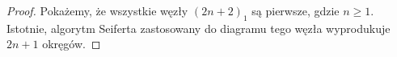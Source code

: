 \begin{proof}
    Pokażemy, że wszystkie węzły $(2n+2)_1$ są pierwsze, gdzie $n \ge 1$.
    Istotnie, algorytm Seiferta zastosowany do diagramu tego węzła wyprodukuje $2n+1$ okręgów.
\begin{comment}
    \[
        \begin{tikzpicture}[baseline=-0.65ex,scale=0.055]
        \begin{knot}[clip width=10, flip crossing/.list={1,4,5},end tolerance=1pt]
            \node at (0,10) {$\cdots$};
            \strand[semithick] (-30, -5) -- (-5, -5);
            \strand[semithick,-Latex]  (5, -5) -- (30, -5);
            \strand[semithick,Latex-]  (-30,-15) -- (-5,-15);
            \strand[semithick,Latex-]  (5,-15) -- (30,-15);

            \strand[semithick,domain=-90:90] plot ({7.5*cos(\x)-5}, {5*sin(\x)-10});
            \strand[semithick,domain=90:270] plot ({7.5*cos(\x)+5}, {5*sin(\x)-10});

            \strand[semithick] (-30, 15) to [out=left, in=up]   (-45, 0);
            \strand[semithick] (-30,-15) to [out=left, in=down] (-45, 0);
            \strand[semithick] (-30,  5) to [out=left, in=up]   (-35, 0);
            \strand[semithick] (-30, -5) to [out=left, in=down] (-35, 0);

            \strand[semithick] (30, 15) to [out=right, in=up]   (45,0);
            \strand[semithick] (30,-15) to [out=right, in=down] (45,0);
            \strand[semithick] (30,  5) to [out=right, in=up]   (35,0);
            \strand[semithick] (30, -5) to [out=right, in=down] (35,0);

            \strand[semithick] (-30, 15) .. controls (-24, 15) and (-24,  5) .. (-20,  5);
            \strand[semithick] (-30,  5) .. controls (-24,  5) and (-24, 15) .. (-20, 15);
            \strand[semithick] (-10, 15) .. controls (-16, 15) and (-16,  5) .. (-20,  5);
            \strand[semithick] (-10,  5) .. controls (-16,  5) and (-16, 15) .. (-20, 15);

            \strand[semithick] (30, 15) .. controls (24, 15) and (24,  5) .. (20,  5);
            \strand[semithick] (10, 15) .. controls (16, 15) and (16,  5) .. (20,  5);
            \strand[semithick] (30,  5) .. controls (24,  5) and (24, 15) .. (20, 15);
            \strand[semithick] (10,  5) .. controls (16,  5) and (16, 15) .. (20, 15);
        \end{knot}
        \end{tikzpicture}
        \longrightarrow
        \begin{tikzpicture}[baseline=-0.65ex,scale=0.055]
            \node at (0,10) {$\cdots$};
            \draw[semithick] (-30,  -5) -- (30, -5);
            \draw[semithick] (-30, -15) -- (30,-15);


\end{comment}
\end{proof}
